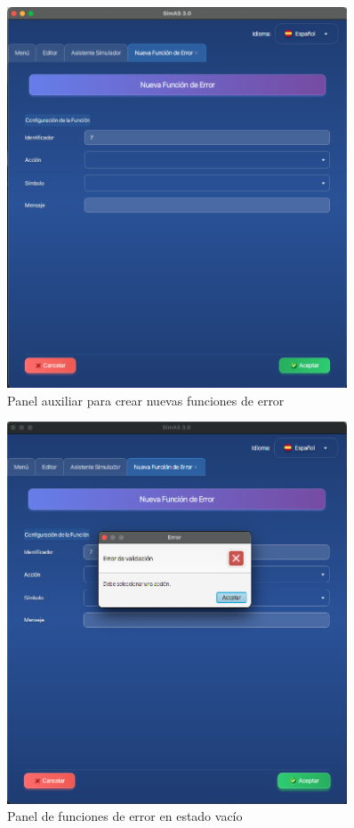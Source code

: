 \needspace{8cm}
\begin{figure}[H]
    \centering
    \includegraphics[width=0.9\textwidth]{figuras/simulador/panelFuncError.png}
    \caption{Panel auxiliar para crear nuevas funciones de error}
    \label{fig:panel_funciones_error}
\end{figure}

\needspace{8cm}
\begin{figure}[H]
    \centering
    \includegraphics[width=0.9\textwidth]{figuras/simulador/panelFuncError_vacia.png}
    \caption{Panel de funciones de error en estado vacío}
    \label{fig:panel_funciones_error_vacio}
\end{figure}

